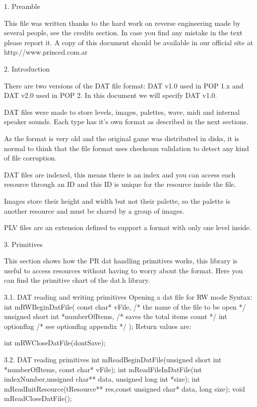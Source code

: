 1. Preamble
   ~~~~~~~~

 This file was written thanks to the hard work on reverse engineering made
 by several people, see the credits section. In case you find any mistake
 in the text please report it. A copy of this document should be available
 in our official site at http://www.princed.com.ar


2. Introduction
   ~~~~~~~~~~~~

 There are two versions of the DAT file format: DAT v1.0 used in POP 1.x
 and DAT v2.0 used in POP 2. In this document we will specify DAT v1.0.

 DAT files were made to store levels, images, palettes, wave, midi and
 internal speaker sounds. Each type has it's own format as described in
 the next sections.

 As the format is very old and the original game was distributed in disks,
 it is normal to think that the file format uses checksum validation to
 detect any kind of file corruption.

 DAT files are indexed, this means there is an index and you can access
 each resource through an ID and this ID is unique for the resource inside
 the file.

 Images store their height and width but not their palette, so the palette
 is another resource and must be shared by a group of images.

 PLV files are an extension defined to support a format with only one level
 inside.


3. Primitives
   ~~~~~~~~~~

 This section shows how the PR dat handling primitives works, this library
 is useful to access resources without having to worry about the format.
 Here you can find the primitive chart of the dat.h library.

3.1. DAT reading and writing primitives
 Opening a dat file for RW mode
 Syntax:
 int mRWBeginDatFile(
  const char* vFile, /* the name of the file to be open */
  unsigned short int *numberOfItems, /* saves the total items count */
  int optionflag /* see optionflag appendix */
 );
 Return values are:

 int mRWCloseDatFile(dontSave);

3.2. DAT reading primitives
 int  mReadBeginDatFile(unsigned short int *numberOfItems,
      const char* vFile);
 int  mReadFileInDatFile(int indexNumber,unsigned char** data,
      unsigned long int *size);
 int  mReadInitResource(tResource** res,const unsigned char* data,
      long size);
 void mReadCloseDatFile();

